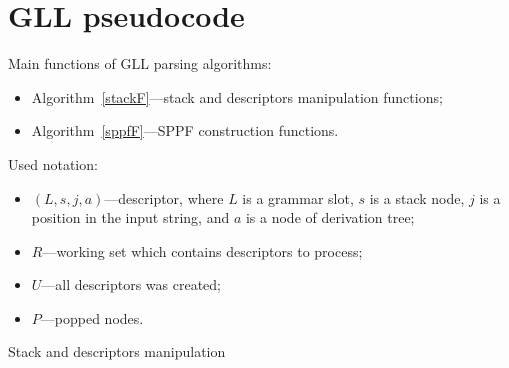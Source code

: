 \appendix

\section{GLL pseudocode}\label{GLLCode}

Main functions of GLL parsing algorithms: 
\begin{itemize}
\item Algorithm~\ref{stackF}---stack and descriptors manipulation functions;
\item Algorithm~\ref{sppfF}---SPPF construction functions.
\end{itemize}

Used notation:
\begin{itemize}
\item $(L, s, j, a)$---descriptor, where $L$ is a grammar slot, $s$ is a stack node, $j$ is a position in the input string, and $a$ is a node of derivation tree;
\item $R$---working set which contains descriptors to process;
\item $U$---all descriptors was created;
\item $P$---popped nodes.
\end{itemize}


\begin{algorithm}
\begin{algorithmic}[1]
\caption{Stack and descriptors manipulation}
\label{stackF}
  \EndIf
\EndFunction

      \EndFor
  \EndIf
\EndFunction

  \EndIf
      \EndFor
  \EndIf
\EndFunction

\end{algorithmic}
\end{algorithm}


